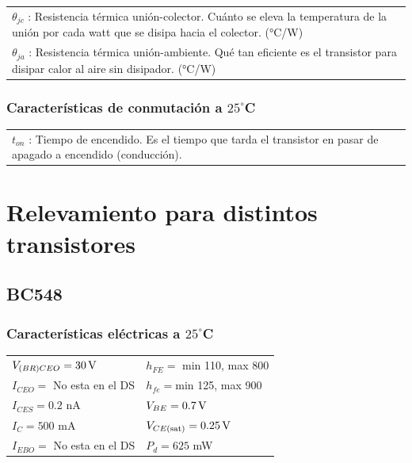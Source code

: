 \documentclass[chaptersright]{informeutn}
\begin{document}
\begin{tabular}{p{14cm}}
    $\theta_{jc}$ : Resistencia térmica unión-colector. Cuánto se eleva la temperatura de la unión por cada watt que se disipa hacia el colector. (°C/W) \\
    $\theta_{ja}$ : Resistencia térmica unión-ambiente. Qué tan eficiente es el transistor para disipar calor al aire sin disipador. (°C/W) \\
\end{tabular}

\vspace{1em}
\subsubsection{Características de conmutación a $25^\circ$C}

\begin{tabular}{p{14cm}}
    $t_{on}$ : Tiempo de encendido. Es el tiempo que tarda el transistor en pasar de apagado a encendido (conducción). \\
\end{tabular}

  \section{Relevamiento para distintos transistores}

    \subsection{BC548}
  
    \subsubsection{Características eléctricas a $25^\circ$C}
    \begin{tabular}{ll}
    $V_{(BR)CEO} = 30 \,\mathrm{V}$         & \hspace{2cm} $h_{FE} =$ min 110, max 800 \\
    $I_{CEO} = $ No esta en el DS           & \hspace{2cm} $h_{fe} = $min 125, max 900 \\
    $I_{CES} = 0.2 $ nA             & \hspace{2cm} $V_{BE} = 0.7 \,\mathrm{V} $ \\
    $I_C = 500$ mA                & \hspace{2cm} $V_{CE(\text{sat})} =0.25 \,\mathrm{V} $ \\
    $I_{EBO} = $ No esta en el DS             & \hspace{2cm} $P_d = 625$ mW \\
    \end{tabular}
    
\end{document}
